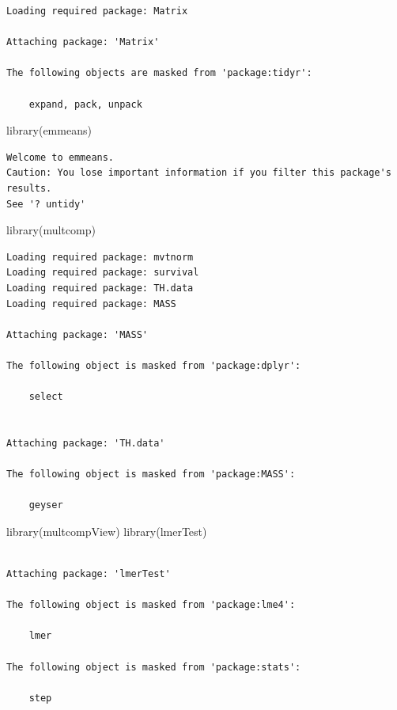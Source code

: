\documentclass[
  letterpaper,
  DIV=11,
  numbers=noendperiod]{scrartcl}
\newenvironment{Shaded}{\begin{snugshade}}{\end{snugshade}}
\newcommand{\FunctionTok}[1]{\textcolor[rgb]{0.28,0.35,0.67}{#1}}
\newcommand{\NormalTok}[1]{\textcolor[rgb]{0.00,0.23,0.31}{#1}}
\begin{document}
\begin{verbatim}
Loading required package: Matrix

Attaching package: 'Matrix'

The following objects are masked from 'package:tidyr':

    expand, pack, unpack
\end{verbatim}

\begin{Shaded}
\begin{Highlighting}[]
\FunctionTok{library}\NormalTok{(emmeans)}
\end{Highlighting}
\end{Shaded}

\begin{verbatim}
Welcome to emmeans.
Caution: You lose important information if you filter this package's results.
See '? untidy'
\end{verbatim}

\begin{Shaded}
\begin{Highlighting}[]
\FunctionTok{library}\NormalTok{(multcomp)}
\end{Highlighting}
\end{Shaded}

\begin{verbatim}
Loading required package: mvtnorm
Loading required package: survival
Loading required package: TH.data
Loading required package: MASS

Attaching package: 'MASS'

The following object is masked from 'package:dplyr':

    select


Attaching package: 'TH.data'

The following object is masked from 'package:MASS':

    geyser
\end{verbatim}

\begin{Shaded}
\begin{Highlighting}[]
\FunctionTok{library}\NormalTok{(multcompView)}
\FunctionTok{library}\NormalTok{(lmerTest)}
\end{Highlighting}
\end{Shaded}

\begin{verbatim}

Attaching package: 'lmerTest'

The following object is masked from 'package:lme4':

    lmer

The following object is masked from 'package:stats':

    step
\end{verbatim}
\end{document}
